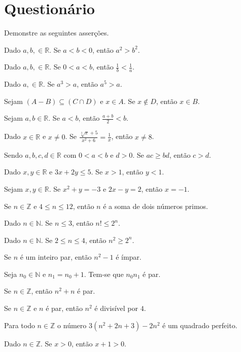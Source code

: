 \section{Questionário}\label{sec:Questionario2part1}

\begin{problem}\label{prob:Demosntracoes1}
	Demonstre as seguintes asserções.
\end{problem}

\begin{exerList}
	\item Dado $a, b, \in \mathbb{R}$. Se $a < b < 0$, então $a^2 > b^2$.
	\item Dado $a, b, \in \mathbb{R}$. Se $0 < a < b$, então $\frac{1}{b} < \frac{1}{a}$.
	\item Dado $a, \in \mathbb{R}$. Se $a^3 > a$, então $a^5 > a$.
	\item Sejam $(A - B) \subseteq (C \cap D)$ e $x \in A$. Se $x \notin D$, então $x \in B$.
	\item Sejam $a, b \in \mathbb{R}$. Se $a < b$, então $\frac{a + b}{2} < b$.
	\item Dado $x \in \mathbb{R}$ e $x \neq 0$. Se $\frac{\sqrt[3]{x} + 5}{x^2 + 6} = \frac{1}{x}$, então $x \neq 8$.
	\item Sendo $a, b, c, d \in \mathbb{R}$ com $0 < a < b$ e $d > 0$. Se $ac \geq bd$, então $c > d$.
	\item Dado $x, y \in \mathbb{R}$ e $3x + 2y \leq 5$. Se $x > 1$, então $y < 1$.
	\item Sejam $x, y \in \mathbb{R}$. Se $x^2 + y = -3$ e $2x - y = 2$, então $x = -1$.
	\item Se $n \in \mathbb{Z}$ e $4 \leq n \leq 12$, então $n$ é a soma de dois números primos.
	\item Dado $n \in \mathbb{N}$. Se $n \leq 3$, então $n! \leq 2^n$.
	\item Dado $n \in \mathbb{N}$. Se $2 \leq n \leq 4$, então $n^2 \geq 2^n$. 
	\item Se $n$ é um inteiro par, então $n^2 - 1$ é ímpar.
	\item Seja $n_0 \in \mathbb{N}$ e $n_1 = n_0 + 1$. Tem-se que $n_0n_1$ é par.
	\item Se $n \in \mathbb{Z}$, então $n^2 + n$ é par.
	\item Se $n \in \mathbb{Z}$ e $n$ é par, então $n^2$ é divisível por $4$. 
	\item Para todo $n \in \mathbb{Z}$ o número $3(n^2 + 2n + 3) - 2n^2$ é um quadrado perfeito.
	\item Dado $n \in \mathbb{Z}$. Se $x > 0$, então $x + 1 > 0$.

\end{exerList}
